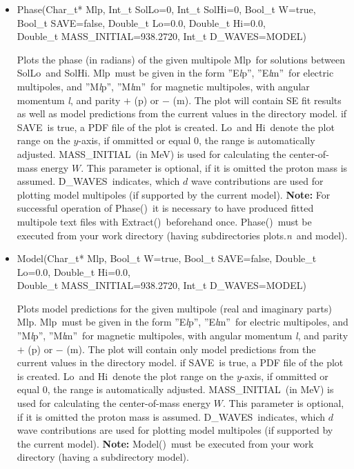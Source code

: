 \documentclass[a4paper,10pt]{article}
\def\tt{\ttfamily}
\def\rm{\rmfamily}
\begin{document}
\begin{itemize}
\item
\tt Phase(Char\_t* Mlp, Int\_t SolLo=0, Int\_t SolHi=0, Bool\_t W=true,\\
\phantom{Phase(}Bool\_t SAVE=false, Double\_t Lo=0.0, Double\_t Hi=0.0,\\
\phantom{Phase(}Double\_t MASS\_INITIAL=938.2720, Int\_t D\_WAVES=MODEL)\rm

Plots the phase (in radians) of the given multipole \tt Mlp\rm\ for solutions between \tt SolLo\rm\ and \tt SolHi\rm.
\tt Mlp\rm\ must be given in the form \tt ''E\textit{l}p''\rm,
\tt ''E\textit{l}m''\rm\ 
for electric multipoles, and
\tt ''M\textit{l}p''\rm,
\tt ''M\textit{l}m''\rm\ 
for magnetic multipoles, with angular momentum \tt\textit{l}\rm, and parity
$+$ (\tt p\rm) or $-$ (\tt m\rm). The plot will contain SE fit results as well as model predictions from the current
values in the directory \tt model\rm.
if \tt SAVE\rm\ is true, a PDF file of the plot is created. \tt Lo\rm\ and \tt Hi\rm\ denote the plot range on the $y$-axis, 
if ommitted or equal 0, the range is automatically adjusted.
\tt MASS\_INITIAL\rm\ (in MeV) is used for calculating the center-of-mass energy $W$. This parameter 
is optional, if it is omitted the proton mass is assumed.
\tt D\_WAVES\rm\ indicates, which $d$ wave contributions are used for plotting model multipoles (if supported by the current model).
\textbf{Note:} For successful operation of \tt Phase()\rm\ it is necessary to have produced
fitted multipole text files with \tt Extract()\rm\ beforehand once. \tt Phase()\rm\ must be executed from your
work directory (having subdirectories \tt plots.\textit{n}\rm\ and \tt model\rm).

\item
\tt Model(Char\_t* Mlp, Bool\_t W=true, Bool\_t SAVE=false, Double\_t Lo=0.0, Double\_t Hi=0.0,\\
\phantom{Model(}Double\_t MASS\_INITIAL=938.2720, Int\_t D\_WAVES=MODEL)\rm

Plots model predictions for the given multipole (real and imaginary parts) \tt Mlp\rm.
\tt Mlp\rm\ must be given in the form \tt ''E\textit{l}p''\rm,
\tt ''E\textit{l}m''\rm\ 
for electric multipoles, and
\tt ''M\textit{l}p''\rm,
\tt ''M\textit{l}m''\rm\ 
for magnetic multipoles, with angular momentum \tt\textit{l}\rm, and parity
$+$ (\tt p\rm) or $-$ (\tt m\rm). The plot will contain only model predictions from the current
values in the directory \tt model\rm.
if \tt SAVE\rm\ is true, a PDF file of the plot is created. \tt Lo\rm\ and \tt Hi\rm\ denote the plot range on the $y$-axis, 
if ommitted or equal 0, the range is automatically adjusted.
\tt MASS\_INITIAL\rm\ (in MeV) is used for calculating the center-of-mass energy $W$. This parameter 
is optional, if it is omitted the proton mass is assumed.
\tt D\_WAVES\rm\ indicates, which $d$ wave contributions are used for plotting model multipoles (if supported by the current model).
\textbf{Note:}  \tt Model()\rm\ must be executed from your
work directory (having a subdirectory \tt model\rm).



\end{itemize}
\end{document}
